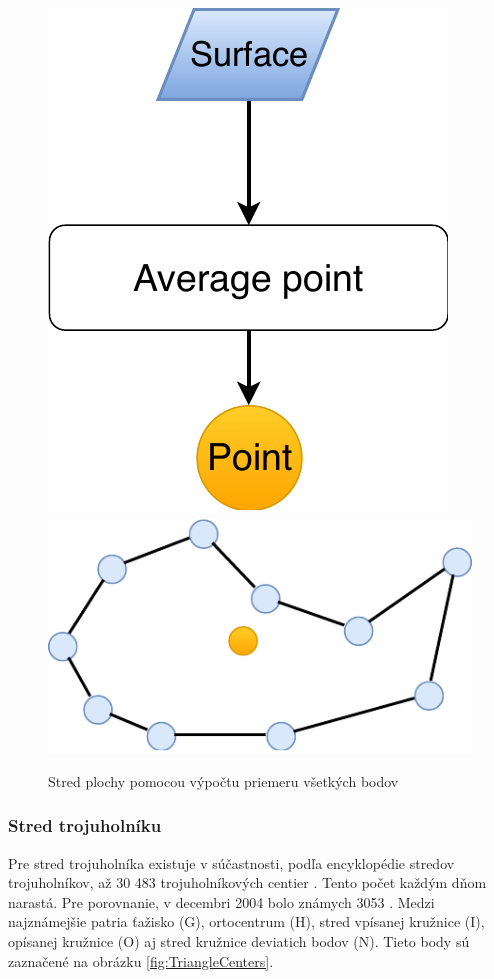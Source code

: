 \begin{figure}[H]
	\centering
	\includegraphics[height=0.3\textwidth]{obrazky-figures/Diagram/Point/DP Navrh operacii-0D - PointCenter of surface.pdf}
	\includegraphics[height=0.3\textwidth]{obrazky-figures/Diagram/Draw/1Points/DP Navrh operacii-0D - PointCenter of surface.pdf}
	\caption{Stred plochy pomocou výpočtu priemeru všetkých bodov}
	\label{fig:1}
\end{figure}

\subsubsection{Stred trojuholníku}
Pre stred trojuholníka existuje v súčastnosti, podľa encyklopédie stredov trojuholníkov, až 30 483 trojuholníkových centier \cite{http://faculty.evansville.edu/ck6/encyclopedia/ETC.html}. Tento počet každým dňom narastá. Pre porovnanie, v decembri 2004 bolo známych 3053 \cite{http://mathworld.wolfram.com/KimberlingCenter.html}. Medzi najznámejšie patria ťažisko (G), ortocentrum (H), stred vpísanej kružnice (I), opísanej kružnice (O) aj stred kružnice deviatich bodov (N). Tieto body sú zaznačené na obrázku \ref{fig:TriangleCenters}.


